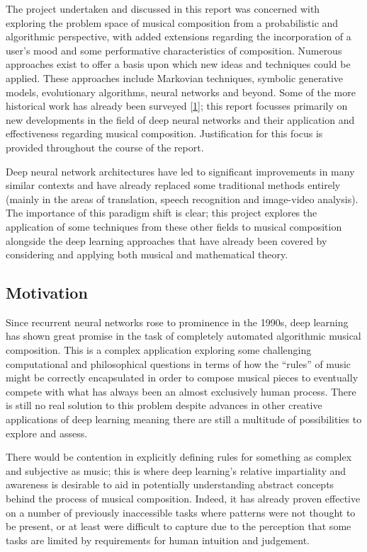 \documentclass[12pt,]{article}
\begin{document}
The project undertaken and discussed in this report was concerned with
exploring the problem space of musical composition from a probabilistic
and algorithmic perspective, with added extensions regarding the
incorporation of a user's mood and some performative characteristics of
composition. Numerous approaches exist to offer a basis upon which new
ideas and techniques could be applied. These approaches include
Markovian techniques, symbolic generative models, evolutionary
algorithms, neural networks and beyond. Some of the more historical work
has already been surveyed
{[}\protect\hyperlink{ref-nierhaus2009algorithmic}{1}{]}; this report
focusses primarily on new developments in the field of deep neural
networks and their application and effectiveness regarding musical
composition. Justification for this focus is provided throughout the
course of the report.

Deep neural network architectures have led to significant improvements
in many similar contexts and have already replaced some traditional
methods entirely (mainly in the areas of translation, speech recognition
and image-video analysis). The importance of this paradigm shift is
clear; this project explores the application of some techniques from
these other fields to musical composition alongside the deep learning
approaches that have already been covered by considering and applying
both musical and mathematical theory.

\hypertarget{motivation}{%
\subsection{Motivation}\label{motivation}}

Since recurrent neural networks rose to prominence in the 1990s, deep
learning has shown great promise in the task of completely automated
algorithmic musical composition. This is a complex application exploring
some challenging computational and philosophical questions in terms of
how the ``rules'' of music might be correctly encapsulated in order to
compose musical pieces to eventually compete with what has always been
an almost exclusively human process. There is still no real solution to
this problem despite advances in other creative applications of deep
learning meaning there are still a multitude of possibilities to explore
and assess.

There would be contention in explicitly defining rules for something as
complex and subjective as music; this is where deep learning's relative
impartiality and awareness is desirable to aid in potentially
understanding abstract concepts behind the process of musical
composition. Indeed, it has already proven effective on a number of
previously inaccessible tasks where patterns were not thought to be
present, or at least were difficult to capture due to the perception
that some tasks are limited by requirements for human intuition and
judgement.
\end{document}
